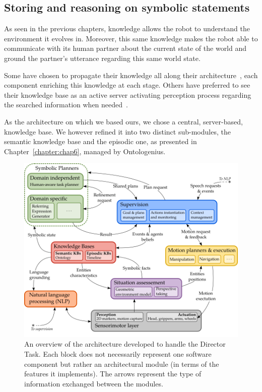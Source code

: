 \documentclass[a4paper,11pt,twoside]{StyleThese}
\begin{document}
\subsection{Storing and reasoning on symbolic statements}

As seen in the previous chapters, knowledge allows the robot to understand the environment it evolves in. Moreover, this same knowledge makes the robot able to communicate with its human partner about the current state of the world and ground the partner's utterance regarding this same world state.

Some have chosen to propagate their knowledge all along their architecture~\cite{hawes_2007_balt}, each component enriching this knowledge at each stage. Others have preferred to see their knowledge base as an active server activating perception process regarding the searched information when needed~\cite{beetz_2018_know}.

As the architecture on which we based ours, we chose a central, server-based, knowledge base. We however refined it into two distinct sub-modules, the semantic knowledge base and the episodic one, as presented in Chapter~\ref{chapter:chap6}, managed by Ontologenius.

\begin{figure}[t!]
	\centering
	\includegraphics[scale=0.40]{figures/chapter4/architecture.png}
	\caption{\label{chap9:fig:architecture} An overview of the architecture developed to handle the Director Task. Each block does not necessarily represent one software component but rather an architectural module (in terms of the features it implements). The arrows represent the type of information exchanged between the modules.}
\end{figure}
\end{document}
